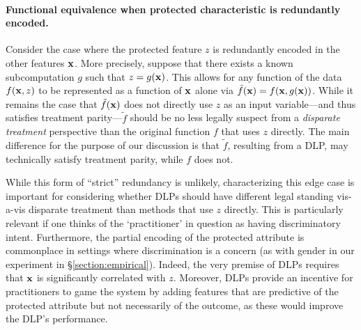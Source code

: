 \paragraph{Functional equivalence when protected characteristic is redundantly encoded.}
Consider the case where the protected feature $z$ 
is redundantly encoded in the other features $\mathbf x$.  
More precisely, 
suppose that there exists a known subcomputation $g$ 
such that $z = g(\mathbf x)$.  
This allows for any function of the data $f(\mathbf x,z)$ 
to be represented as a function of $\mathbf x$ alone via $\tilde f(\mathbf x) = f(\mathbf x, g(\mathbf x))$.   
While it remains the case that $\tilde f(\mathbf x)$ does not directly use $z$ as an input variable---and thus satisfies treatment parity---$\tilde f$ should be no less legally suspect from a \textit{disparate treatment} perspective 
than the original function $f$ that uses $z$ directly. 
The main difference for the purpose of our discussion 
is that $\tilde f$, resulting from a DLP, may technically satisfy treatment parity, while $f$ does not.  

While this form of ``strict'' redundancy is unlikely, characterizing this edge case is
important for considering whether DLPs should have different legal standing vis-a-vis disparate treatment than methods
that use $z$ directly. This is particularly relevant if one thinks of the `practitioner' in question as having discriminatory
intent. Furthermore, the partial encoding of the protected attribute is commonplace in settings where discrimination
is a concern (as with gender in our experiment in \S \ref{section:empirical}). Indeed, the very premise of DLPs requires that $\mathbf x$ is
significantly correlated with $z$. Moreover, DLPs provide an incentive for practitioners to game the system by adding
features that are predictive of the protected attribute but not necessarily of the outcome, as these would improve the
 DLP's performance.

